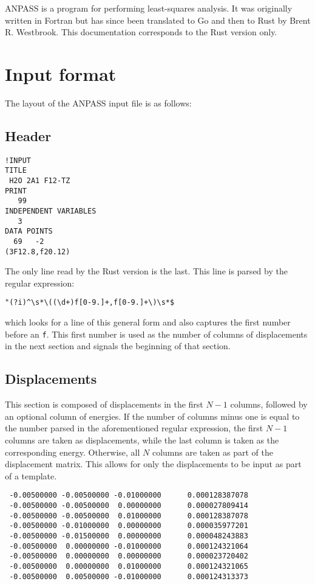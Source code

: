 \documentclass{article}
\begin{document}
ANPASS is a program for performing least-squares analysis. It was originally
written in Fortran but has since been translated to Go and then to Rust by Brent
R. Westbrook. This documentation corresponds to the Rust version only.

\section{Input format}

The layout of the ANPASS input file is as follows:

\subsection{Header}

\begin{lstlisting}
!INPUT
TITLE
 H2O 2A1 F12-TZ
PRINT
   99
INDEPENDENT VARIABLES
   3
DATA POINTS
  69   -2
(3F12.8,f20.12)
\end{lstlisting}

\noindent
The only line read by the Rust version is the last. This line is parsed by the
regular expression:

\begin{lstlisting}
"(?i)^\s*\((\d+)f[0-9.]+,f[0-9.]+\)\s*$
\end{lstlisting}%

\noindent
which looks for a line of this general form and also captures the first number
before an \verb|f|. This first number is used as the number of columns of
displacements in the next section and signals the beginning of that section.

\subsection{Displacements}

This section is composed of displacements in the first $N-1$ columns, followed
by an optional column of energies. If the number of columns minus one is equal
to the number parsed in the aforementioned regular expression, the first $N-1$
columns are taken as displacements, while the last column is taken as the
corresponding energy. Otherwise, all $N$ columns are taken as part of the
displacement matrix. This allows for only the displacements to be input as part
of a template.

\begin{lstlisting}
 -0.00500000 -0.00500000 -0.01000000      0.000128387078
 -0.00500000 -0.00500000  0.00000000      0.000027809414
 -0.00500000 -0.00500000  0.01000000      0.000128387078
 -0.00500000 -0.01000000  0.00000000      0.000035977201
 -0.00500000 -0.01500000  0.00000000      0.000048243883
 -0.00500000  0.00000000 -0.01000000      0.000124321064
 -0.00500000  0.00000000  0.00000000      0.000023720402
 -0.00500000  0.00000000  0.01000000      0.000124321065
 -0.00500000  0.00500000 -0.01000000      0.000124313373
\end{lstlisting}
\end{document}
